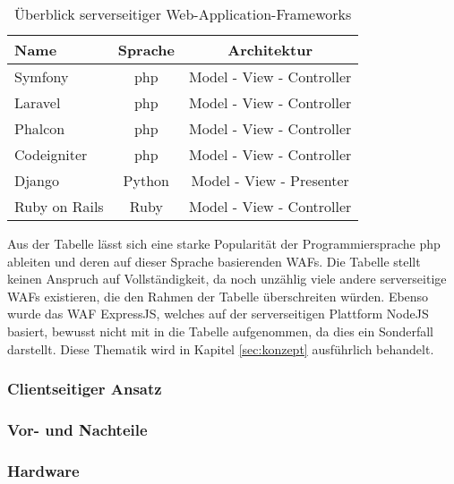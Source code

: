 \begin{table}[H]
	\centering
	\caption{Überblick serverseitiger Web-Application-Frameworks}
	\label{tab:spektrometer}
	\begin{tabular}{lcc}
		\textbf{Name} & \textbf{Sprache} & \textbf{Architektur}   \\ 
		\hline 
		Symfony & php & Model - View - Controller \\
		Laravel	& php & Model - View - Controller  \\ 
		Phalcon	& php & Model - View - Controller   \\ 
		Codeigniter & php & Model - View - Controller \\
		Django & Python & Model - View - Presenter \\		
		Ruby on Rails & Ruby & Model - View - Controller \\
		\hline 
	\end{tabular} 
\end{table}

Aus der Tabelle lässt sich eine starke Popularität der Programmiersprache php ableiten und deren auf dieser Sprache basierenden WAFs. Die Tabelle stellt keinen Anspruch auf Vollständigkeit, da noch unzählig viele andere serverseitige WAFs existieren, die den Rahmen der Tabelle überschreiten würden. Ebenso wurde das WAF ExpressJS, welches auf der serverseitigen Plattform NodeJS basiert, bewusst nicht mit in die Tabelle aufgenommen, da dies ein Sonderfall darstellt. Diese Thematik wird in Kapitel \ref{sec:konzept} ausführlich behandelt. 
\subsubsection{Clientseitiger Ansatz}\label{sec:clientseitigeransatz}

\subsubsection{Vor- und Nachteile}\label{sec:vorundnachteileweb}
\subsubsection{Hardware}\label{sec:hardware}